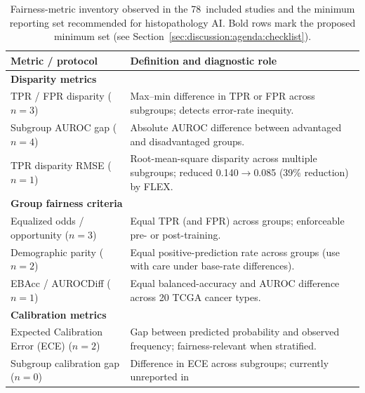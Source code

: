 \begin{table}[htbp]
  \centering
    \caption{Fairness-metric inventory observed in the 78~included
           studies and the minimum reporting set recommended for
           histopathology AI.  Bold rows mark the proposed minimum
           set (see Section~\ref{sec:discussion:agenda:checklist}).}
  \label{tab:fairness_metrics}
  \small
  \begin{tabularx}{\linewidth}{@{}p{7.6cm} X@{}}
    \toprule
    \textbf{Metric / protocol} &
      \textbf{Definition and diagnostic role} \\
    \midrule
    \multicolumn{2}{l}{\textbf{Disparity metrics}} \\
    TPR / FPR disparity ($n=3$) \citep{vaidya2024demographic,huang2025knowledge,soltan2024challenges} &
      Max--min difference in TPR or FPR across subgroups;
      detects error-rate inequity. \\
    Subgroup AUROC gap ($n=4$) \citep{vaidya2024demographic,zong2023medfair,lin2025contrastive,huang2025knowledge} &
      Absolute AUROC difference between advantaged and disadvantaged
      groups. \\
    TPR disparity RMSE ($n=1$) \citep{huang2025knowledge} &
      Root-mean-square disparity across multiple subgroups;
      reduced 0.140$\to$0.085 (39\% reduction) by FLEX. \\
    \midrule
    \multicolumn{2}{l}{\textbf{Group fairness criteria}} \\
    Equalized odds / opportunity ($n=3$) \citep{soltan2024challenges,sufian2024mitigating,cecconi2024fairness} &
      Equal TPR (and FPR) across groups; enforceable pre- or
      post-training. \\
    Demographic parity ($n=2$) \citep{soltan2024challenges,lin2025contrastive} &
      Equal positive-prediction rate across groups (use with care
      under base-rate differences). \\
    EBAcc / AUROCDiff ($n=1$) \citep{lin2025contrastive} &
      Equal balanced-accuracy and AUROC difference across 20 TCGA
      cancer types. \\
    \midrule
    \multicolumn{2}{l}{\textbf{Calibration metrics}} \\
    Expected Calibration Error (ECE) ($n=2$) \citep{roschewitz2023automatic,zong2023medfair} &
      Gap between predicted probability and observed frequency;
      fairness-relevant when stratified. \\
    Subgroup calibration gap ($n=0$) &
      Difference in ECE across subgroups; currently unreported in

\end{tabularx}
\end{table}
